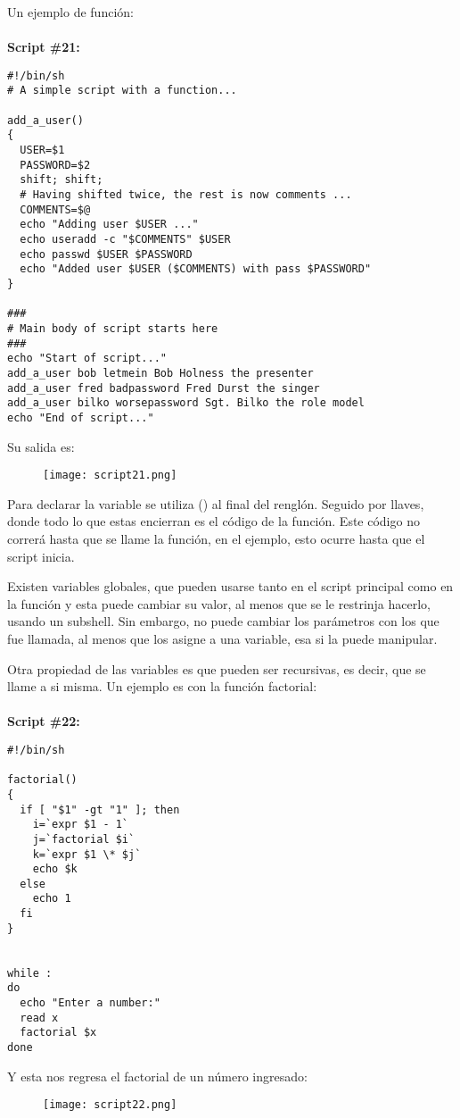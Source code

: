 \documentclass[a4paper]{article}
\begin{document}
Un ejemplo de función: \\
\\ 
\textbf{Script \#21:}
\begin{verbatim}
#!/bin/sh
# A simple script with a function...

add_a_user()
{
  USER=$1
  PASSWORD=$2
  shift; shift;
  # Having shifted twice, the rest is now comments ...
  COMMENTS=$@
  echo "Adding user $USER ..."
  echo useradd -c "$COMMENTS" $USER
  echo passwd $USER $PASSWORD
  echo "Added user $USER ($COMMENTS) with pass $PASSWORD"
}

###
# Main body of script starts here
###
echo "Start of script..."
add_a_user bob letmein Bob Holness the presenter
add_a_user fred badpassword Fred Durst the singer
add_a_user bilko worsepassword Sgt. Bilko the role model
echo "End of script..."
\end{verbatim}

Su salida es:
\begin{figure}[h!]
  \texttt{[image: script21.png]}
  \centering
  \label{fig:34}
\end{figure}

Para declarar la variable se utiliza () al final del renglón. Seguido por llaves, donde todo lo que estas encierran es el código de la función. Este código no correrá hasta que se llame la función, en el ejemplo, esto ocurre hasta que el script inicia. 

Existen variables globales, que pueden usarse tanto en el script principal como en la función y esta puede cambiar su valor, al menos que se le restrinja hacerlo, usando un subshell. Sin embargo, no puede cambiar los parámetros con los que fue llamada, al menos que los asigne a una variable, esa si la puede manipular.

Otra propiedad de las variables es que pueden ser recursivas, es decir, que se llame a si misma. Un ejemplo es con la función factorial: \\
\\
\textbf{Script \#22:}
\begin{verbatim}
#!/bin/sh

factorial()
{
  if [ "$1" -gt "1" ]; then
    i=`expr $1 - 1`
    j=`factorial $i`
    k=`expr $1 \* $j`
    echo $k
  else
    echo 1
  fi
}


while :
do
  echo "Enter a number:"
  read x
  factorial $x
done
\end{verbatim}

Y esta nos regresa el factorial de un número ingresado:
 \begin{figure}[h!]
  \texttt{[image: script22.png]}
  \centering
  \label{fig:35}
\end{figure}
\end{document}
